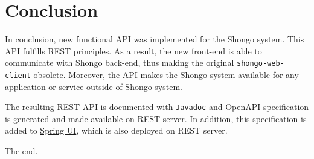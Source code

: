 \chapter{Conclusion}
In conclusion, new functional API was implemented for the Shongo system.
This API fulfills REST principles.
As a result, the new front-end \cite{drobnakm} is able to communicate with Shongo back-end, thus making the original \texttt{shongo-web-client} obsolete.
Moreover, the API makes the Shongo system available for any application or service outside of Shongo system.

The resulting REST API is documented with \texttt{Javadoc} and \hyperref[sec:openapi]{OpenAPI specification} is generated and made available on REST server.
In addition, this specification is added to \hyperref[sec:spring]{Spring UI}, which is also deployed on REST server.

The end.